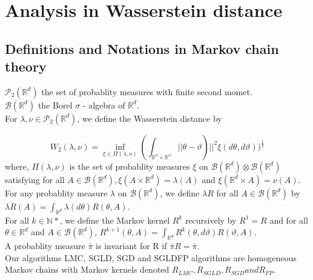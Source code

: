 \documentclass[a4paper]{article}
\begin{document}
\section{Analysis in Wasserstein distance}
\subsection{Definitions and Notations in Markov chain theory}
$\mathcal{P}_2(\mathbb{R}^d)$ the set of probablity measures with finite second momet.\\
$\mathcal{B}(\mathbb{R}^d)$ the Borel $\sigma$ - algebra of $\mathbb{R}^d$.\\
For $\lambda, \nu \in \mathcal{P}_2(\mathbb{R}^d)$, we define the Wasserstein distance by 

$$W_2(\lambda, \nu) =\inf_{\xi \in \Pi(\lambda, \nu)}(\int_{\mathbb{\mathbb{R}^d \times \mathbb{R}^d}}||\theta-\vartheta)||^2 \xi(d\theta, d\vartheta))^{\frac{1}{2}}$$
where, $\Pi(\lambda, \nu)$ is the set of probablity measures $\xi$ on $\mathcal{B}(\mathbb{R}^d)\otimes\mathcal{B}(\mathbb{R}^d)$ satisfying for all $A \in \mathcal{B}(\mathbb{R}^d), \xi(A \times \mathbb{R}^d)= \lambda(A)$ and $\xi (\mathbb{R}^d \times A) = \nu(A)$.\\
For any probablity measure $\lambda$ on $\mathcal{B}(\mathbb{R}^d)$, we define $\lambda R$ for all $A \in \mathcal{B}(\mathbb{R}^d)$ by $\lambda R(A) = \int_{\mathbb{R}^d}\lambda(d\theta)R(\theta, A)$.\\
For all $k\in \mathbb{N}*$, we define the Markov kernel $R^k$ recursively by $R^1 = R$ and for all $\theta \in \mathbb{R}^d$ and $A \in \mathcal{B}(\mathbb{R}^d)$, $R^{k+1}(\theta, A) = \int_{\mathbb{R}^d}  R^k(\theta, d\vartheta)R(\vartheta, A).$\\
A probablity measure $\bar{\pi}$ is invariant for R if $\bar{\pi}R = \bar{\pi}$.\\
Our algorithms LMC, SGLD, SGD and SGLDFP algorithms are homogeneous Markov chains with Markov kernels denoted $R_{LMC}, R_{SGLD}, R_{SGD} and R_{FP}$.
\end{document}
